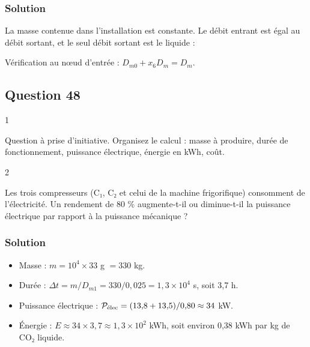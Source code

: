 \documentclass[11pt,a4paper]{article}
\providecommand{\tightlist}{\setlength{\itemsep}{0pt}\setlength{\parskip}{0pt}}
\newcommand{\equationajustee}[1]{%
  \sbox{\boiteequation}{$\displaystyle #1$}%
  \ifdim\wd\boiteequation>\linewidth
    \[\resizebox{\linewidth}{!}{\usebox{\boiteequation}}\]%
  \else
    \[#1\]%
  \fi}
\begin{document}
\hypertarget{solution-46}{%
\subsubsection{Solution}\label{solution-46}}

La masse contenue dans l'installation est constante. Le débit entrant est égal au débit sortant, et le seul débit sortant est le liquide :

\equationajustee{\boxed{D_{m0}=D_{m1}\approx2{,}5\times10^{-2}\ \text{kg·s}^{-1}}}

Vérification au nœud d'entrée : \(D_{m0}+x_6D_m=D_m\).

\hypertarget{question-48}{%
\subsection{Question 48}\label{question-48}}

\begin{indication}{1}

Question à prise d'initiative. Organisez le calcul : masse à produire, durée de fonctionnement, puissance électrique, énergie en kWh, coût.

\end{indication}

\begin{indication}{2}

Les trois compresseurs (C₁, C₂ et celui de la machine frigorifique) consomment de l'électricité. Un rendement de 80 \% augmente-t-il ou diminue-t-il la puissance électrique par rapport à la puissance mécanique ?

\end{indication}

\hypertarget{solution-47}{%
\subsubsection{Solution}\label{solution-47}}

\begin{itemize}
\tightlist
\item
  Masse : \(m=10^4\times33\) g \(=330\) kg.
\item
  Durée : \(\Delta t=m/D_{m1}=330/0{,}025=1{,}3\times10^4\) s, soit 3,7 h.
\item
  Puissance électrique : \(\mathcal P_{\text{\text{élec}}}=(13{,}8+13{,}5)/0{,}80\approx34\) kW.
\item
  Énergie : \(E\approx34\times3{,}7\approx1{,}3\times10^2\) kWh, soit environ 0,38 kWh par kg de CO₂ liquide.
\end{itemize}
\end{document}
